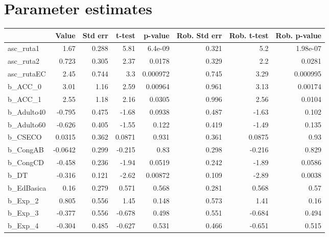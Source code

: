 \section{Parameter estimates}
\begin{tabular}{lrrrrrrr}
\toprule
{} &   Value &  Std err &    t-test &  p-value &  Rob. Std err &  Rob. t-test &  Rob. p-value \\
\midrule
asc\_ruta1     &    1.67 &    0.288 &      5.81 &  6.4e-09 &         0.321 &          5.2 &      1.98e-07 \\
asc\_ruta2     &   0.723 &    0.305 &      2.37 &   0.0178 &         0.329 &          2.2 &        0.0281 \\
asc\_rutaEC    &    2.45 &    0.744 &       3.3 & 0.000972 &         0.745 &         3.29 &      0.000995 \\
b\_ACC\_0       &    3.01 &     1.16 &      2.59 &  0.00964 &         0.961 &         3.13 &       0.00174 \\
b\_ACC\_1       &    2.55 &     1.18 &      2.16 &   0.0305 &         0.996 &         2.56 &        0.0104 \\
b\_Adulto40    &  -0.795 &    0.475 &     -1.68 &   0.0938 &         0.487 &        -1.63 &         0.102 \\
b\_Adulto60    &  -0.626 &    0.405 &     -1.55 &    0.122 &         0.419 &        -1.49 &         0.135 \\
b\_CSECO       &  0.0315 &    0.362 &    0.0871 &    0.931 &         0.361 &       0.0875 &          0.93 \\
b\_CongAB      & -0.0642 &    0.299 &    -0.215 &     0.83 &         0.298 &       -0.216 &         0.829 \\
b\_CongCD      &  -0.458 &    0.236 &     -1.94 &   0.0519 &         0.242 &        -1.89 &        0.0586 \\
b\_DT          &  -0.316 &    0.121 &     -2.62 &  0.00872 &         0.109 &        -2.89 &        0.0038 \\
b\_EdBasica    &    0.16 &    0.279 &     0.571 &    0.568 &         0.281 &        0.568 &          0.57 \\
b\_Exp\_2       &   0.805 &    0.556 &      1.45 &    0.148 &         0.573 &         1.41 &          0.16 \\
b\_Exp\_3       &  -0.377 &    0.556 &    -0.678 &    0.498 &         0.551 &       -0.684 &         0.494 \\
b\_Exp\_4       &  -0.304 &    0.485 &    -0.627 &    0.531 &         0.466 &       -0.651 &         0.515 \\

\end{tabular}
